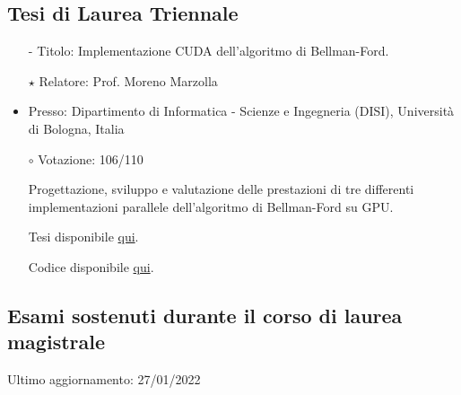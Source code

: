 \documentclass[curriculum-vitae]{subfiles}
\begin{document}
		\subsection*{Tesi di Laurea Triennale}
			\begin{itemize}
				\item[-] {\large Titolo:} Implementazione CUDA dell'algoritmo di Bellman-Ford.
				\item[$\star$] {\large Relatore:} Prof. Moreno Marzolla
				\item {\large Presso:} Dipartimento di Informatica - Scienze e Ingegneria (DISI), Università di Bologna, Italia
				\item[$\circ$] {\large Votazione:} 106/110
				\item[] Progettazione, sviluppo e valutazione delle prestazioni di tre differenti implementazioni parallele dell'algoritmo di Bellman-Ford su GPU.
				\item[] Tesi disponibile \href{https://amslaurea.unibo.it/24313}{qui}.
				\item[] Codice disponibile \href{https://github.com/Ledmington/bellman-ford-cuda}{qui}.
			\end{itemize}
		
		\subsection*{Esami sostenuti durante il corso di laurea magistrale}
			{\small Ultimo aggiornamento: 27/01/2022}
			\medskip
			
			\begin{minipage}[t]{.47\textwidth}
			\end{minipage}
			\hfill
			\begin{minipage}[t]{.47\textwidth}
			\end{minipage}
\end{document}
